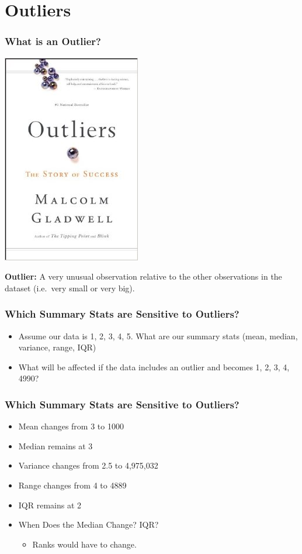 \documentclass{beamer}
\begin{document}
\section{Outliers}
\begin{frame}
\frametitle{What is an Outlier?}
	\begin{center}
		\includegraphics[scale = 0.4]{./images/outliers.jpg}
	\end{center}
	\centering
	\textbf{Outlier:} A very unusual observation relative to the other observations in the dataset 		(i.e.\ very small or very big).
\end{frame}

\begin{frame}
\frametitle{Which Summary Stats are Sensitive to Outliers?}
	\begin{itemize}
		\item Assume our data is 1, 2, 3, 4, 5. What are our summary stats (mean, median, variance, 			range, IQR)
		\item What will be affected if the data includes an outlier and becomes 1, 2, 3, 4, 4990?
	\end{itemize}
\end{frame}

\begin{frame}
\frametitle{Which Summary Stats are Sensitive to Outliers?}
	\begin{itemize}[<+->]
		\item Mean changes from 3 to 1000
		\item Median remains at 3
		\item Variance changes from 2.5 to 4,975,032
		\item Range changes from 4 to 4889
		\item IQR remains at 2
		\item \alert{When Does the Median Change? IQR?}
		\begin{itemize}
			\item Ranks would have to change.
		\end{itemize}
	\end{itemize}
\end{frame}
\end{document}
